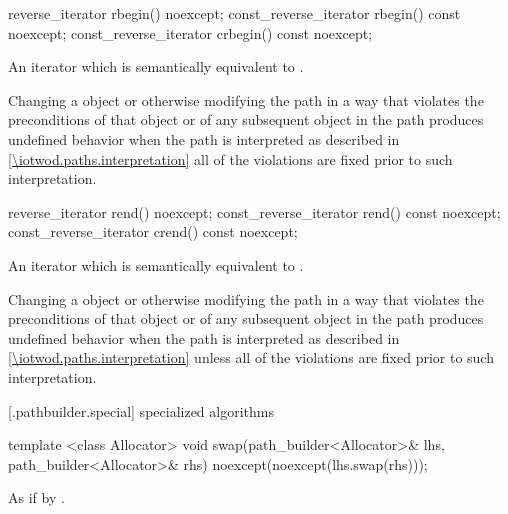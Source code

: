 %
%
\begin{itemdecl}
reverse_iterator rbegin() noexcept;
const_reverse_iterator rbegin() const noexcept;
const_reverse_iterator crbegin() const noexcept;
\end{itemdecl}
\begin{itemdescr}
\pnum
\returns
An iterator which is semantically equivalent to .

\pnum
\remarks
Changing a  object or otherwise modifying the path in a way that violates the preconditions of that  object or of any subsequent  object in the path produces undefined behavior when the path is interpreted as described in \ref{\iotwod.paths.interpretation} all of the violations are fixed prior to such interpretation.
\end{itemdescr}

%
%
\begin{itemdecl}
reverse_iterator rend() noexcept;
const_reverse_iterator rend() const noexcept;
const_reverse_iterator crend() const noexcept;
\end{itemdecl}
\begin{itemdescr}
\pnum
\returns
An iterator which is semantically equivalent to .

\pnum
\remarks
Changing a  object or otherwise modifying the path in a way that violates the preconditions of that  object or of any subsequent  object in the path produces undefined behavior when the path is interpreted as described in \ref{\iotwod.paths.interpretation} unless all of the violations are fixed prior to such interpretation.
\end{itemdescr}

[\iotwod.pathbuilder.special] { specialized algorithms}

%
\begin{itemdecl}
template <class Allocator>
void swap(path_builder<Allocator>& lhs, path_builder<Allocator>& rhs)
  noexcept(noexcept(lhs.swap(rhs)));
\end{itemdecl}
\begin{itemdescr}
\pnum
\effects
As if by .
\end{itemdescr}
